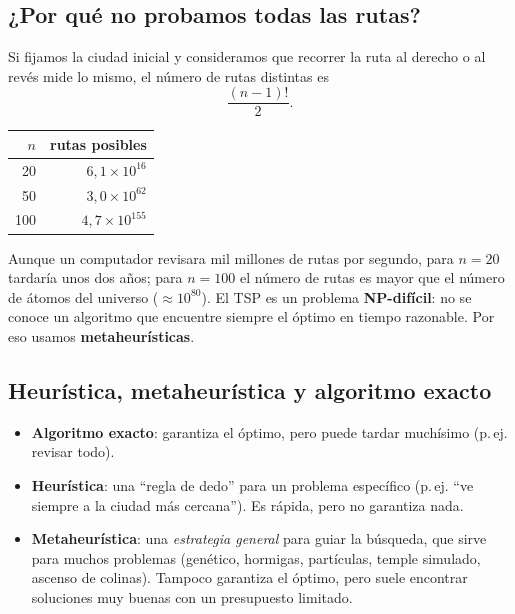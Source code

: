 \documentclass[11pt,a4paper]{article}
\begin{document}
\subsection{¿Por qué no probamos todas las rutas?}

\begin{mate}
Si fijamos la ciudad inicial y consideramos que recorrer la ruta al derecho o al revés mide lo mismo, el número de rutas distintas es
\[
\frac{(n-1)!}{2}.
\]
\begin{center}
\begin{tabular}{rr}
\toprule
$n$ & rutas posibles \\
\midrule
20 & $6{,}1\times10^{16}$\\
50 & $3{,}0\times10^{62}$\\
100 & $4{,}7\times10^{155}$\\
\bottomrule
\end{tabular}
\end{center}
\end{mate}

\begin{idea}
Aunque un computador revisara mil millones de rutas por segundo, para $n=20$ tardaría unos dos años; para $n=100$ el número de rutas
es mayor que el número de átomos del universo ($\approx10^{80}$). El TSP es un problema \textbf{NP-difícil}:
no se conoce un algoritmo que encuentre siempre el óptimo en tiempo razonable. Por eso usamos \textbf{metaheurísticas}.
\end{idea}

\subsection{Heurística, metaheurística y algoritmo exacto}

\begin{itemize}
  \item \textbf{Algoritmo exacto}: garantiza el óptimo, pero puede tardar muchísimo (p.\,ej. revisar todo).
  \item \textbf{Heurística}: una ``regla de dedo'' para un problema específico (p.\,ej. ``ve siempre a la ciudad más cercana'').
        Es rápida, pero no garantiza nada.
  \item \textbf{Metaheurística}: una \emph{estrategia general} para guiar la búsqueda, que sirve para muchos problemas
        (genético, hormigas, partículas, temple simulado, ascenso de colinas). Tampoco garantiza el óptimo,
        pero suele encontrar soluciones muy buenas con un presupuesto limitado.
\end{itemize}
\end{document}
